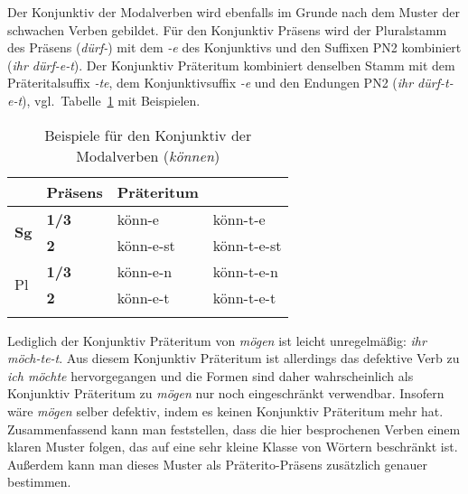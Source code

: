 \begin{table}
  \caption{Präteritum der Modalverben}
  \label{tab:modpraet}
\end{table}

Der Konjunktiv der Modalverben wird ebenfalls im Grunde nach dem Muster der schwachen Verben gebildet.
Für den Konjunktiv Präsens wird der Pluralstamm des Präsens (\textit{dürf-}) mit dem \textit{-e} des Konjunktivs und den Suffixen PN2 kombiniert (\textit{ihr dürf-e-t}).
Der Konjunktiv Präteritum kombiniert denselben Stamm mit dem Präteritalsuffix \textit{-te}, dem Konjunktivsuffix \textit{-e} und den Endungen PN2 (\textit{ihr dürf-t-e-t}), vgl.\ Tabelle~\ref{tab:modvkonj} mit Beispielen.

\begin{table}
  \centering
  \begin{tabular}{llll}
    \lsptoprule
    \multicolumn{2}{c}{} & \textbf{Präsens} & \textbf{Präteritum} \\
    \midrule
    \multirow{2}{*}{\textbf{Sg}} & \textbf{1/3} & könn-e & könn-t-e \\
    & \textbf{2} & könn-e-st & könn-t-e-st \\
    \midrule
    \multirow{2}{*}{Pl} & \textbf{1/3} & könn-e-n & könn-t-e-n \\
    & \textbf{2} & könn-e-t & könn-t-e-t \\
    \lspbottomrule
  \end{tabular}
  \caption{Beispiele für den Konjunktiv der Modalverben (\textit{können})}
  \label{tab:modvkonj}
\end{table}

Lediglich der Konjunktiv Präteritum von \textit{mögen} ist leicht unregelmäßig: \textit{ihr möch-te-t}.
Aus diesem Konjunktiv Präteritum ist allerdings das defektive Verb zu \textit{ich möchte} hervorgegangen und die Formen sind daher wahrscheinlich als Konjunktiv Präteritum zu \textit{mögen} nur noch eingeschränkt verwendbar.
Insofern wäre \textit{mögen} selber defektiv, indem es keinen Konjunktiv Präteritum mehr hat.
Zusammenfassend kann man feststellen, dass die hier besprochenen Verben einem klaren Muster folgen, das auf eine sehr kleine Klasse von Wörtern beschränkt ist.
Außerdem kann man dieses Muster als Präterito-Präsens zusätzlich genauer bestimmen.

